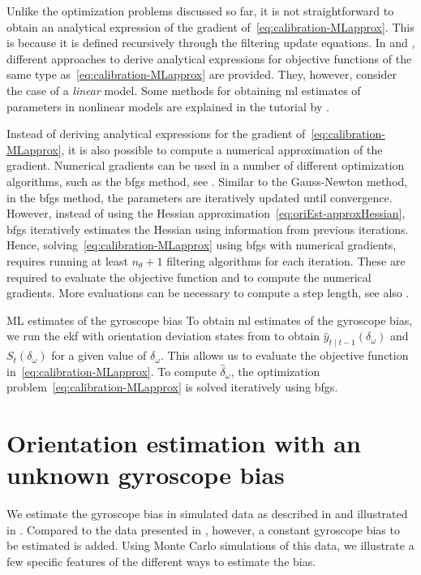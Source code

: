 Unlike the optimization problems discussed so far, it is not straightforward to obtain an analytical expression of the gradient of~\eqref{eq:calibration-MLapprox}. This is because it is defined recursively through the filtering update equations. In \cite{astrom:1980} and \cite{segalW:1989}, different approaches to derive analytical expressions for objective functions of the same type as~\eqref{eq:calibration-MLapprox} are provided. They, however, consider the case of a \emph{linear} model. Some methods for obtaining \gls{ml} estimates of parameters in nonlinear models are explained in the tutorial by \cite{schonLDWNSD:2015}.

Instead of deriving analytical expressions for the gradient of~\eqref{eq:calibration-MLapprox}, it is also possible to compute a numerical approximation of the gradient. Numerical gradients can be used in a number of different optimization algorithms, such as the \gls{bfgs} method, see \eg \cite{nocedalW:2006}. Similar to the Gauss-Newton method, in the \gls{bfgs} method, the parameters are iteratively updated until convergence. However, instead of using the Hessian approximation~\eqref{eq:oriEst-approxHessian}, \gls{bfgs} iteratively estimates the Hessian using information from previous iterations. Hence, solving~\eqref{eq:calibration-MLapprox} using \gls{bfgs} with numerical gradients, requires running at least $n_\theta+1$ filtering algorithms for each iteration. These are required to evaluate the objective function and to compute the numerical gradients. More evaluations can be necessary to compute a step length, see also .

\begin{myexample}{ML estimates of the gyroscope bias}%
To obtain \gls{ml} estimates of the gyroscope bias, we run the \gls{ekf} with orientation deviation states from  to obtain $\hat{y}_{t\mid t-1}(\delta_\omega)$ and $S_t(\delta_\omega)$ for a given value of $\delta_\omega$. This allows us to evaluate the objective function in~\eqref{eq:calibration-MLapprox}. To compute $\hat{\delta}_\omega$, the optimization problem~\eqref{eq:calibration-MLapprox} is solved iteratively using \gls{bfgs}.   
\end{myexample}

\section{Orientation estimation with an unknown gyroscope bias}
\label{sec:calibration-gyrBias}
We estimate the gyroscope bias in simulated data as described in  and illustrated in . Compared to the data presented in , however, a constant gyroscope bias to be estimated is added. Using Monte Carlo simulations of this data, we illustrate a few specific features of the different ways to estimate the bias. 

